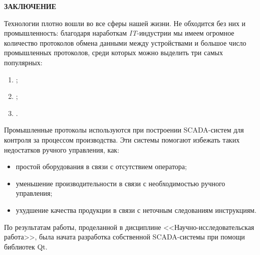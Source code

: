 \begin{center}
	\normalsize\bfseries\MakeUppercase{заключение}
\end{center}

Технологии плотно вошли во все сферы нашей жизни. Не обходится без них и промышленность: благодаря наработкам \textit{IT}-индустрии мы имеем огромное количество протоколов обмена данными между устройствами и большое число промышленных протоколов, среди которых можно выделить три самых популярных:
\begin{enumerate}
	\item \mb;
	\item \pb;
	\item \ffb. 
\end{enumerate}

Промышленные протоколы используются при построении SCADA-систем для контроля за процессом производства. Эти системы помогают избежать таких недостатков ручного управления, как:
\begin{itemize}
	\item простой оборудования в связи с отсутствием оператора;
	\item уменьшение производительности в связи с необходимостью ручного управления;
	\item ухудшение качества продукции в связи с неточным следованиям инструкциям.
\end{itemize}

По результатам работы, проделанной в дисциплине <<Научно-исследовательс\-кая работа>>, была начата разработка собственной SCADA-системы при помощи библиотек Qt.

